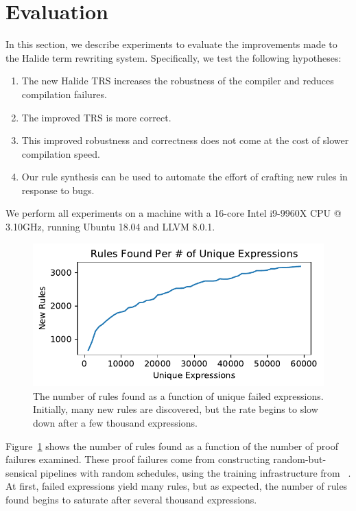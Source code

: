 \documentclass[sigplan,10pt,review,anonymous]{acmart}\settopmatter{printfolios=true,printccs=false,printacmref=false}
\begin{document}
\section{Evaluation}
In this section, we describe experiments to evaluate the improvements made to the Halide term rewriting system.  Specifically, we
test the following hypotheses:
\begin{enumerate}
\item The new Halide TRS increases the robustness of the compiler and reduces compilation failures.
\item The improved TRS is more correct.
\item This improved robustness and correctness does not come at the cost of slower compilation speed.
\item Our rule synthesis can be used to automate the effort of crafting new rules in response to bugs.
\end{enumerate}

We perform all experiments on a machine with a 16-core Intel i9-9960X CPU @ 3.10GHz,
running Ubuntu 18.04 and LLVM 8.0.1.

\begin{figure}[htb]
  \includegraphics[width=\columnwidth]{figures/num-rules-found.pdf}
  \caption{The number of rules found as a function of unique failed expressions.  Initially, many new rules are discovered,
    but the rate begins to slow down after a few thousand expressions.}
  \label{fig:num-rules-found}
\end{figure}

Figure~\ref{fig:num-rules-found} shows the number of rules found as a function of the number of proof failures
examined.  These proof failures come from constructing random-but-sensical pipelines with random schedules,
using the training infrastructure from \citeauthor{Adams2019}~\cite{Adams2019}.
At first, failed expressions yield many rules, but as expected, the number of rules found
begins to saturate after several thousand expressions.
\end{document}
